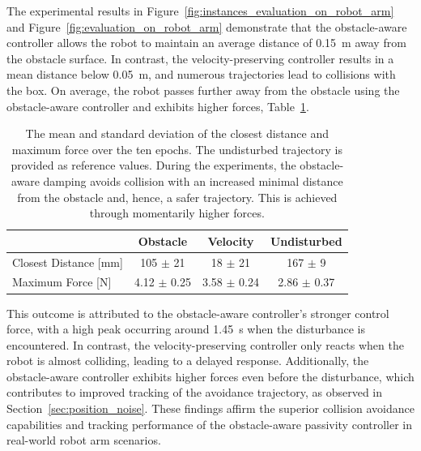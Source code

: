 The experimental results in \ifthesis Figure~\ref{fig:instances_evaluation_on_robot_arm} and \fi Figure~\ref{fig:evaluation_on_robot_arm} demonstrate that the obstacle-aware controller allows the robot to maintain an average distance of \qty{0.15}{m} away from the obstacle surface. In contrast, the velocity-preserving controller results in a mean distance below \qty{0.05}{m}, and numerous trajectories lead to collisions with the box. On average, the robot passes further away from the obstacle using the obstacle-aware controller and exhibits higher forces, Table~\ref{tab:evaluation_on_robot_arm}.

\begin{table}[htb]
    \centering
    \begin{tabular}{|l|c|c||c|} \hline
        & Obstacle & Velocity & Undisturbed \\ \hline
         Closest Distance [mm] &  {105 $\pm$ 21} & 18 $\pm$ 21 & 167 $\pm$ 9 \\ \hline
         Maximum Force [N] & {4.12 $\pm$ 0.25} & 3.58 $\pm$ 0.24 & 2.86 $\pm$ 0.37  \\ \hline 
    \end{tabular}
    \caption{The mean and standard deviation of the closest distance and maximum force over the ten epochs.
    The undisturbed trajectory is provided as reference values.
    During the experiments, the obstacle-aware damping avoids collision with an increased minimal distance from the obstacle and, hence, a safer trajectory. This is achieved through momentarily higher forces.}
    \label{tab:evaluation_on_robot_arm}
\end{table}

This outcome is attributed to the obstacle-aware controller's stronger control force, with a high peak occurring around \qty{1.45}{s} when the disturbance is encountered. In contrast, the velocity-preserving controller only reacts when the robot is almost colliding, leading to a delayed response. Additionally, the obstacle-aware controller exhibits higher forces even before the disturbance, which contributes to improved tracking of the avoidance trajectory, as observed in Section~\ref{sec:position_noise}. These findings affirm the superior collision avoidance capabilities and tracking performance of the obstacle-aware passivity controller in real-world robot arm scenarios.

